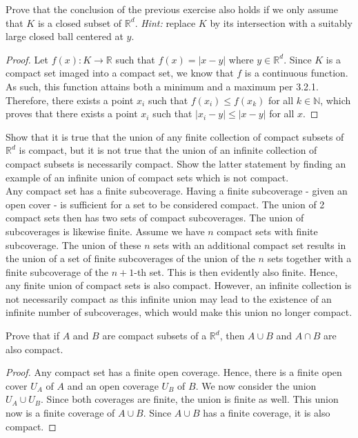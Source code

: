 \documentclass[12pt]{book}
\newcommand{\N}{\mathbb{N}}
\newcommand{\R}{\mathbb{R}}
\newenvironment{exercise}[2][Exercise]{\begin{trivlist}
\item[\hskip \labelsep {\bfseries #1}\hskip \labelsep {\bfseries #2.}]}{\end{trivlist}}
\begin{document}
\begin{exercise}{7.4.6}
Prove that the conclusion of the previous exercise also holds if we only assume that $K$ is a closed subset of $\R^d$. \emph{Hint:} replace $K$ by its intersection with a suitably large closed ball centered at $y$.

    \begin{proof}
    Let $f(x): K \to \R$ such that $f(x) = |x-y|$ where $y \in \R^d$. Since $K$ is a compact set imaged into a compact set, we know that $f$ is a continuous function. As such, this function attains both a minimum and a maximum per 3.2.1. Therefore, there exists a point $x_i$ such that $f(x_i) \leq f(x_k)$ for all $k \in \N$, which proves that there exists a point $x_i$ such that $\left| x_i - y \right| \leq \left| x- y \right| $ for all $x$.
    \end{proof}
\end{exercise}




\begin{exercise}{7.4.9}
Show that it is true that the union of any finite collection of compact
subsets of $\R^d$ is compact, but it is not true that the union of an infinite
collection of compact subsets is necessarily compact. Show the latter
statement by finding an example of an infinite union of compact sets which
is not compact. \\

Any compact set has a finite subcoverage. Having a finite subcoverage - given an open cover - is sufficient for a set to be considered compact. The union of 2 compact sets then has two sets of compact subcoverages. The union of subcoverages is likewise finite. Assume we have $n$ compact sets with finite subcoverage. The union of these $n$ sets with an additional compact set results in the union of a set of finite subcoverages of the union of the $n$ sets together with a finite subcoverage of the $n+1$-th set. This is then evidently also finite. Hence, any finite union of compact sets is also compact. However, an infinite collection is not necessarily compact as this infinite union may lead to the existence of an infinite number of subcoverages, which would make this union no longer compact. 
\end{exercise}



\begin{exercise}{7.4.10}
Prove that if $A$ and $B$ are compact subsets of a $\R^d$, then $A \cup B $ and $A \cap B$ are also compact.
\begin{proof}
    Any compact set has a finite open coverage. Hence, there is a finite open cover $U_A$ of $A$ and an open coverage $U_B$ of $B$. We now consider the union $U_A \cup U_B$. Since both coverages are finite, the union is finite as well. This union now is a finite coverage of $A \cup B$. Since $A \cup B$ has a finite coverage, it is also compact.
\end{proof}
\end{exercise}
\end{document}
